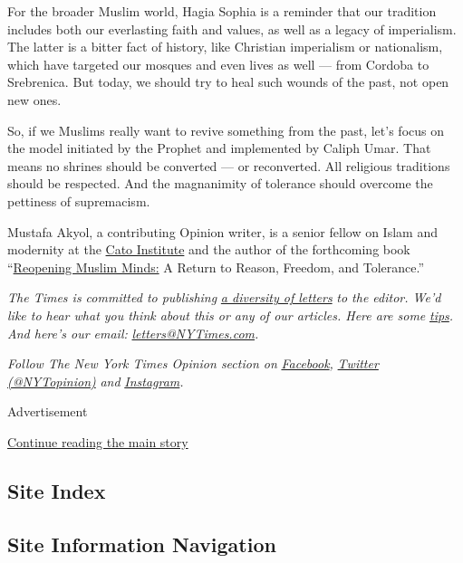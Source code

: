 For the broader Muslim world, Hagia Sophia is a reminder that our
tradition includes both our everlasting faith and values, as well as a
legacy of imperialism. The latter is a bitter fact of history, like
Christian imperialism or nationalism, which have targeted our mosques
and even lives as well --- from Cordoba to Srebrenica. But today, we
should try to heal such wounds of the past, not open new ones.

So, if we Muslims really want to revive something from the past, let's
focus on the model initiated by the Prophet and implemented by Caliph
Umar. That means no shrines should be converted --- or reconverted. All
religious traditions should be respected. And the magnanimity of
tolerance should overcome the pettiness of supremacism.

Mustafa Akyol, a contributing Opinion writer, is a senior fellow on
Islam and modernity at the
\href{https://www.cato.org/people/mustafa-akyol}{Cato Institute} and the
author of the forthcoming book
``\href{https://us.macmillan.com/books/9781250256065}{Reopening Muslim
Minds:} A Return to Reason, Freedom, and Tolerance.''

\emph{The Times is committed to publishing}
\href{https://www.nytimes3xbfgragh.onion/2019/01/31/opinion/letters/letters-to-editor-new-york-times-women.html}{\emph{a
diversity of letters}} \emph{to the editor. We'd like to hear what you
think about this or any of our articles. Here are some}
\href{https://help.nytimes3xbfgragh.onion/hc/en-us/articles/115014925288-How-to-submit-a-letter-to-the-editor}{\emph{tips}}\emph{.
And here's our email:}
\href{mailto:letters@NYTimes.com}{\emph{letters@NYTimes.com}}\emph{.}

\emph{Follow The New York Times Opinion section on}
\href{https://www.facebookcorewwwi.onion/nytopinion}{\emph{Facebook}}\emph{,}
\href{http://twitter.com/NYTOpinion}{\emph{Twitter (@NYTopinion)}}
\emph{and}
\href{https://www.instagram.com/nytopinion/}{\emph{Instagram}}\emph{.}

Advertisement

\protect\hyperlink{after-bottom}{Continue reading the main story}

\hypertarget{site-index}{%
\subsection{Site Index}\label{site-index}}

\hypertarget{site-information-navigation}{%
\subsection{Site Information
Navigation}\label{site-information-navigation}}

